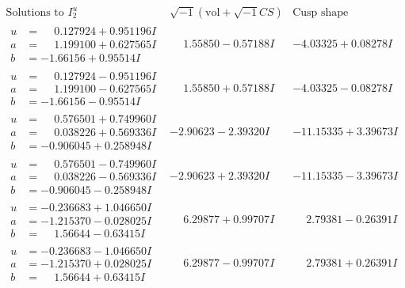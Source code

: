 \documentclass[1p]{elsarticle_modified}
\theoremstyle{definition}
\newcommand{\I}{\sqrt{-1}}
\begin{document}
$$\begin{array}{c|c|c}  
\text{Solutions to }I^u_{2}& \I (\text{vol} + \sqrt{-1}CS) & \text{Cusp shape}\\
 \hline 
\begin{aligned}
u &= \phantom{-}0.127924 + 0.951196 I \\
a &= \phantom{-}1.199100 + 0.627565 I \\
b &= -1.66156 + 0.95514 I\end{aligned}
 & \phantom{-}1.55850 - 0.57188 I & -4.03325 + 0.08278 I \\ \hline\begin{aligned}
u &= \phantom{-}0.127924 - 0.951196 I \\
a &= \phantom{-}1.199100 - 0.627565 I \\
b &= -1.66156 - 0.95514 I\end{aligned}
 & \phantom{-}1.55850 + 0.57188 I & -4.03325 - 0.08278 I \\ \hline\begin{aligned}
u &= \phantom{-}0.576501 + 0.749960 I \\
a &= \phantom{-}0.038226 + 0.569336 I \\
b &= -0.906045 + 0.258948 I\end{aligned}
 & -2.90623 - 2.39320 I & -11.15335 + 3.39673 I \\ \hline\begin{aligned}
u &= \phantom{-}0.576501 - 0.749960 I \\
a &= \phantom{-}0.038226 - 0.569336 I \\
b &= -0.906045 - 0.258948 I\end{aligned}
 & -2.90623 + 2.39320 I & -11.15335 - 3.39673 I \\ \hline\begin{aligned}
u &= -0.236683 + 1.046650 I \\
a &= -1.215370 - 0.028025 I \\
b &= \phantom{-}1.56644 - 0.63415 I\end{aligned}
 & \phantom{-}6.29877 + 0.99707 I & \phantom{-}2.79381 - 0.26391 I \\ \hline\begin{aligned}
u &= -0.236683 - 1.046650 I \\
a &= -1.215370 + 0.028025 I \\
b &= \phantom{-}1.56644 + 0.63415 I\end{aligned}
 & \phantom{-}6.29877 - 0.99707 I & \phantom{-}2.79381 + 0.26391 I \\ \hline\begin{aligned}

\end{aligned}
\end{array}$$
\end{document}
